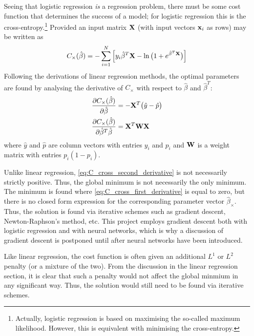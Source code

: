 \documentclass[nofootinbib,reprint,english]{revtex4-1}
\newcommand{\X}{\vb{X}}
\newcommand{\W}{\vb{W}}
\newcommand{\betahat}{\hat{\beta}}
\newcommand{\yhat}{\hat{y}}
\newcommand{\phat}{\hat{p}}
\begin{document}
Seeing that logistic regression \emph{is} a regression problem, there must be some cost function that determines the success of a model; for logistic regression this is the cross-entropy.\footnote{Actually, logistic regression is based on maximising the so-called maximum likelihood. However, this is equivalent with minimising the cross-entropy.} Provided an input matrix \(\X\) (with input vectors \(\vb{x}_i\) as rows) may be written as
\begin{equation}\label{eq:C_cross_entropy}
C_\times(\betahat)=-\sum_{i=1}^N\Big[y_i\betahat^T\X-\ln\big(1+e^{\betahat^T\X}\big)\Big]
\end{equation}
Following the derivations of linear regression methods, the optimal parameters are found by analysing the derivative of \(C_\times\) with respect to \(\betahat\) and \(\betahat^T\):
\begin{subequations}\label{eq:C_cross_derivatives}
\begin{align}
\pdv{C_\times(\betahat)}{\betahat}&=-\X^T\big(\yhat-\phat\big)\label{eq:C_cross_first_derivative}\\
\pdv{C_\times(\betahat)}{\betahat^T\betahat}&=\X^T\W\X\label{eq:C_cross_second_derivative}
\end{align}
\end{subequations}
where \(\yhat\) and \(\phat\) are column vectors with entries \(y_i\) and \(p_i\) and \(\W\) is a weight matrix with entries \(p_i(1-p_i)\).

Unlike linear regression, \eqref{eq:C_cross_second_derivative} is not necessarily strictly positive. Thus, the global minimum is not necessarily the only minimum. The minimum is found where \eqref{eq:C_cross_first_derivative} is equal to zero, but there is no closed form expression for the corresponding parameter vector \(\betahat_\times\). Thus, the solution is found via iterative schemes such as gradient descent, Newton-Raphson's method, etc. This project employs gradient descent both with logistic regression and with neural networks, which is why a discussion of gradient descent is postponed until after neural networks have been introduced.

Like linear regression, the cost function is often given an additional \(L^1\) or \(L^2\) penalty (or a mixture of the two). From the discussion in the linear regression section, it is clear that such a penalty would not affect the global minmium in any significant way. Thus, the solution would still need to be found via iterative schemes.
\end{document}
